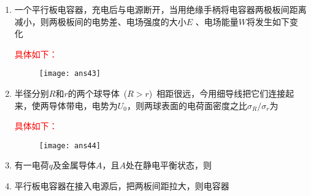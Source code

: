\begin{enumerate}
\begin{note}
{        }
    \end{note}
    \item 一个平行板电容器，充电后与电源断开，当用绝缘手柄将电容器两极板间距离减小，则两极板间的电势差、电场强度的大小$E$ 、电场能量$W$将发生如下变化~
    \begin{note}
        \textcolor{red}{具体如下：}
        \begin{figure}[H]
            \centering
            \texttt{[image: ans43]}
        \end{figure}
    \end{note}
    \item 半径分别$R$和$r$的两个球导体~($R>r$)~相距很远，今用细导线把它们连接起来，使两导体带电，电势为$U_0$，则两球表面的电荷面密度之比$\sigma_R/\sigma_r$为~
    \begin{note}
        \textcolor{red}{具体如下：}
        \begin{figure}[H]
            \centering
            \texttt{[image: ans44]}
        \end{figure}
    \end{note}
    \item 有一电荷$q$及金属导体$A$，且$A$处在静电平衡状态，则~
    \item 平行板电容器在接入电源后，把两板间距拉大，则电容器~
\end{enumerate}
